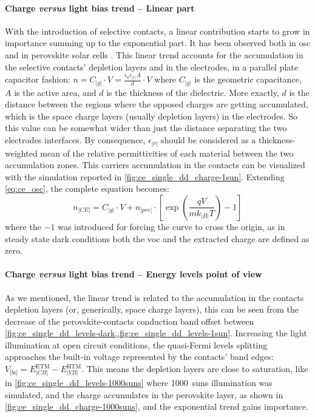 		\paragraph{Charge \textit{versus} light bias trend -- Linear part}
		With the introduction of selective contacts, a linear contribution starts to grow in importance summing up to the exponential part.
		It has been observed both in \gls{osc} \cite{Ryan2017a,Credgington2014} and in perovskite solar cells \cite{Gelmetti2017,Wheeler2017,Du2018}.
		This linear trend accounts for the accumulation in the selective contacts' depletion layers and in the electrodes, in a parallel plate capacitor fashion: $n = C_|g| \cdot V = \frac{\epsilon_0 \epsilon_|r| A}{d} \cdot V$ where $C_|g|$ is the geometric capacitance, $A$ is the active area, and $d$ is the thickness of the dielectric.
		More exactly, $d$ is the distance between the regions where the opposed charges are getting accumulated, which is the space charge layers (usually depletion layers) in the electrodes.
		So this value can be somewhat wider than just the distance separating the two electrodes interfaces.
		By consequence, $\epsilon_|r|$ should be considered as a thickness-weighted mean of the relative permittivities of each material between the two accumulation zones.
		This carriers accumulation in the contacts can be visualized with the simulation reported in \cref{fig:ce_single_dd_charge-1sun}.
		Extending \cref{eq:ce_osc}, the complete equation becomes:
		\begin{equation}\label{eq:ce_full}
			n_|CE| = C_|g| \cdot V + n_|pre| \cdot \left[\exp(\frac{qV}{mk_|B|T}) - 1\right]
		\end{equation}
		where the $-1$ was introduced for forcing the curve to cross the origin, as in steady state dark conditions both the \gls{voc} and the extracted charge are defined as zero.
		
		
		\paragraph{Charge \textit{versus} light bias trend -- Energy levels point of view}\label{ce_energy_levels}
		As we mentioned, the linear trend is related to the accumulation in the contacts depletion layers (or, generically, space charge layers), this can be seen from the decrease of the perovskite-contacts conduction band offset between \cref{fig:ce_single_dd_levels-dark,,fig:ce_single_dd_levels-1sun}.
		Increasing the light illumination at open circuit conditions, the quasi-Fermi levels splitting approaches the built-in voltage represented by the contacts' band edges: $V_|bi| = E_|CB|^{\mathrm{ETM}} - E_|VB|^{\mathrm{HTM}}$.
		This means the depletion layers are close to saturation, like in \cref{fig:ce_single_dd_levels-1000suns} where \SI{1000}{suns} illumination was simulated, and the charge accumulates in the perovskite layer, as shown in \cref{fig:ce_single_dd_charge-1000suns}, and the exponential trend gains importance.

